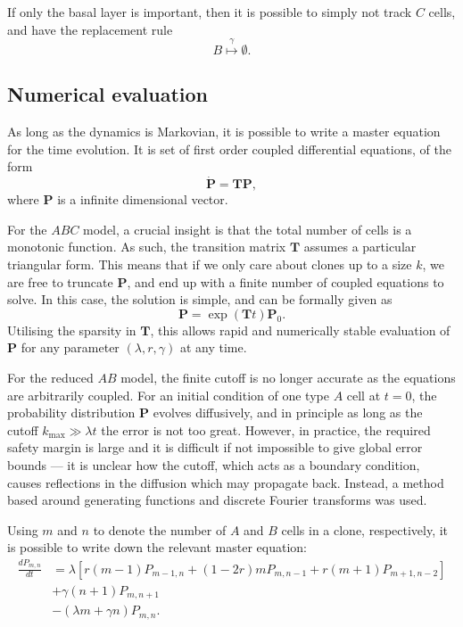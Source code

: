 \documentclass[10pt,english]{article}
\begin{document}
If only the basal layer is important, then it is possible to simply not track $C$ cells, and have the replacement rule \[B \overset{\gamma}{\longmapsto} \emptyset.\]

\subsection{Numerical evaluation}

As long as the dynamics is Markovian, it is possible to write a master equation for the time evolution. It is set of first order coupled differential equations, of the form \[\dot{\mathbf P} = \mathbf T \mathbf P,\] where $\mathbf P$ is a infinite dimensional vector.

For the $ABC$ model, a crucial insight is that the total number of cells is a monotonic function. As such, the transition matrix $\mathbf T$ assumes a particular triangular form. This means that if we only care about clones up to a size $k$, we are free to truncate $\mathbf P$, and end up with a finite number of coupled equations to solve. In this case, the solution is simple, and can be formally given as \[\mathbf P = \exp\left(\mathbf T t\right)\mathbf P_0.\] Utilising the sparsity in $\mathbf T$, this allows rapid and numerically stable evaluation of $\mathbf P$ for any parameter $\left(\lambda, r, \gamma\right)$ at any time.

For the reduced $AB$ model, the finite cutoff is no longer accurate as the equations are arbitrarily coupled. For an initial condition of one type $A$ cell at $t=0$, the probability distribution $\mathbf P$ evolves diffusively, and in principle as long as the cutoff $k_\textrm{max} \gg \lambda t$ the error is not too great. However, in practice, the required safety margin is large and it is difficult if not impossible to give global error bounds --- it is unclear how the cutoff, which acts as a boundary condition, causes reflections in the diffusion which may propagate back. Instead, a method based around generating functions and discrete Fourier transforms was used.

Using $m$ and $n$ to denote the number of $A$ and $B$ cells in a clone, respectively, it is possible to write down the relevant master equation:
\begin{equation*}
\begin{split}
\frac{dP_{m,n}}{dt} &= \lambda\left[r(m-1)P_{m-1,n} + (1-2r)mP_{m,n-1} + r(m+1)P_{m+1,n-2}\right] \\ &+ \gamma (n+1) P_{m,n+1} \\ &- (\lambda m + \gamma n) P_{m,n}.
\end{split}
\end{equation*}
\end{document}
